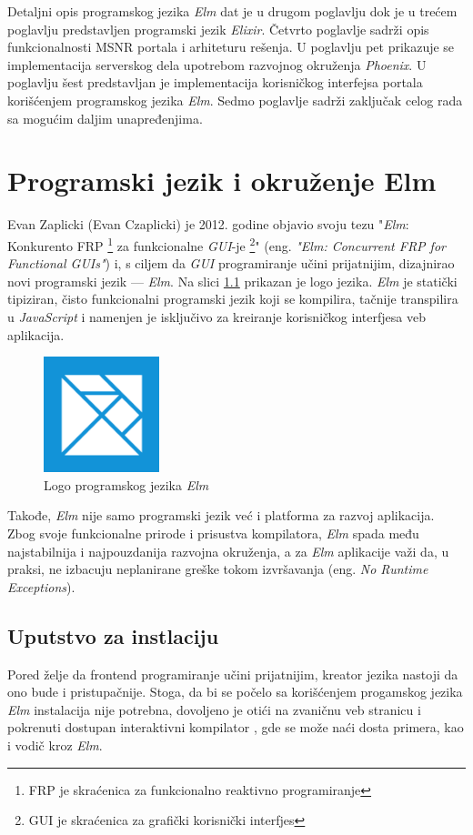 \documentclass[12pt,oneside]{memoir}
\begin{document}
Detaljni opis programskog jezika \emph{Elm} dat je u drugom poglavlju dok je u trećem poglavlju predstavljen programski jezik \emph{Elixir}.
Četvrto poglavlje sadrži opis funkcionalnosti MSNR portala i arhiteturu rešenja.
U poglavlju pet prikazuje se implementacija serverskog dela upotrebom razvojnog
okruženja \emph{Phoenix}. U poglavlju šest predstavljan je implementacija korisničkog interfejsa
portala korišćenjem programskog jezika \emph{Elm}. Sedmo poglavlje sadrži zaključak celog rada sa
mogućim daljim unapređenjima.

\chapter{Programski jezik i okruženje Elm}
Evan Zaplicki (Evan Czaplicki) je 2012. godine objavio svoju tezu "\emph{Elm}: Konkurento FRP
\footnote{FRP je skraćenica za funkcionalno reaktivno programiranje} za funkcionalne \emph{GUI}-je
\footnote{GUI je skraćenica za grafički korisnički interfjes}" (eng. \emph{"Elm: Concurrent
FRP for Functional GUIs"}) \cite{elm:2012} i, s ciljem da \emph{GUI} programiranje učini
prijatnijim, dizajnirao novi programski jezik --- \emph{Elm}. Na slici \ref{fig:elm-logo} prikazan
je logo jezika.
\emph{Elm} je statički tipiziran, čisto funkcionalni programski jezik koji se
kompilira, tačnije transpilira u \emph{JavaScript} i namenjen je isključivo za
kreiranje korisničkog interfjesa veb aplikacija.
\begin{figure}[!ht]
  \centering
  \includegraphics[width=0.3\textwidth]{elm.png}
  \caption{Logo programskog jezika \emph{Elm}}
  \label{fig:elm-logo}
\end{figure}
Takođe, \emph{Elm} nije samo programski jezik već i platforma za razvoj aplikacija.
Zbog svoje funkcionalne prirode i prisustva kompilatora, \emph{Elm} spada među
najstabilnija i najpouzdanija razvojna okruženja, a za \emph{Elm} aplikacije važi
da, u praksi, ne izbacuju neplanirane greške tokom izvršavanja (eng. \emph{No 
Runtime Exceptions}).

\section{Uputstvo za instlaciju}
Pored želje da frontend programiranje učini prijatnijim, kreator jezika nastoji 
da ono bude i pristupačnije. Stoga, da bi se počelo sa korišćenjem progamskog jezika \emph{Elm} instalacija 
nije potrebna, dovoljeno je otići na zvaničnu veb stranicu i pokrenuti dostupan 
interaktivni kompilator \cite{tryelm}, gde se može naći dosta primera, kao i vodič kroz \emph{Elm}.
\end{document}
